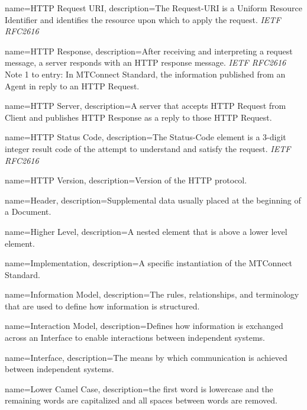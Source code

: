 {
    name={HTTP Request URI},
	description={The Request-URI is a Uniform Resource Identifier and identifies the resource upon which to apply the request. \textit{IETF RFC2616}}
}

{
    name={HTTP Response},
	description={After receiving and interpreting a request message, a server responds with an HTTP response message. \textit{IETF RFC2616}
Note 1 to entry: In MTConnect Standard, the information published from an \gls{Agent} in reply to an \gls{HTTP Request}. }
}

{
    name={HTTP Server},
	description={A server that accepts \gls{HTTP Request} from \gls{Client} and publishes \gls{HTTP Response} as a reply to those \gls{HTTP Request}.}
}

{
    name={HTTP Status Code},
	description={The Status-Code element is a 3-digit integer result code of the attempt to understand and satisfy the request.  \textit{IETF RFC2616}}
}

{
    name={HTTP Version},
	description={Version of the HTTP protocol.}
}

{
    name={Header},
	description={Supplemental data usually placed at the beginning of a \gls{Document}.}
}

{
    name={Higher Level},
	description={A nested element that is above a lower level element.}
}

{
    name={Implementation},
	description={A specific instantiation of the MTConnect Standard.}
}

{
    name={Information Model},
	description={The rules, relationships, and terminology that are used to define how information is structured.}
}

{
    name={Interaction Model},
	description={Defines how information is exchanged across an \gls{Interface} to enable interactions between independent systems.}
}

{
    name={Interface},
	description={The means by which communication is achieved between independent systems.}
}

{
    name={Lower Camel Case},
	description={the first word is lowercase and the remaining words are capitalized and all spaces between words are removed.}
}

